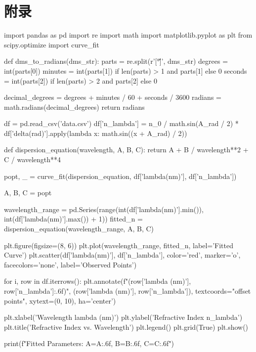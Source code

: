\documentclass[UTF8]{ctexart}
\begin{document}
\section{附录}
\begin{python}
    
    import pandas as pd
    import re
    import math
    import matplotlib.pyplot as plt
    from scipy.optimize import curve_fit

    def dms_to_radians(dms_str):
        parts = re.split(r'[°\'\"]', dms_str)
        degrees = int(parts[0])
        minutes = int(parts[1]) if len(parts) > 1 and parts[1] else 0
        seconds = int(parts[2]) if len(parts) > 2 and parts[2] else 0
    
        decimal_degrees = degrees + minutes / 60 + seconds / 3600
        radians = math.radians(decimal_degrees)
        return radians

    df = pd.read_csv('data.csv')
    df['n_lambda'] = n_0 / math.sin(A_rad / 2) * df['delta(rad)'].apply(lambda x: math.sin((x + A_rad) / 2))

    def dispersion_equation(wavelength, A, B, C):
        return A + B / wavelength**2 + C / wavelength**4

    popt, _ = curve_fit(dispersion_equation, df['lambda(nm)'], df['n_lambda'])

    A, B, C = popt

    wavelength_range = pd.Series(range(int(df['lambda(nm)'].min()), int(df['lambda(nm)'].max()) + 1))
    fitted_n = dispersion_equation(wavelength_range, A, B, C)

    plt.figure(figsize=(8, 6))
    plt.plot(wavelength_range, fitted_n, label='Fitted Curve')
    plt.scatter(df['lambda(nm)'], df['n_lambda'], color='red', marker='o', facecolors='none', label='Observed Points')

    for i, row in df.iterrows():
        plt.annotate(f"({row['lambda (nm)']}, {row['n_lambda']:.6f})", (row['lambda (nm)'], row['n_lambda']), textcoords="offset points", xytext=(0, 10), ha='center')

    plt.xlabel('Wavelength lambda (nm)') 
    plt.ylabel('Refractive Index n_lambda')
    plt.title('Refractive Index vs. Wavelength')
    plt.legend()
    plt.grid(True)
    plt.show()

    print(f"Fitted Parameters: A={A:.6f}, B={B:.6f}, C={C:.6f}")
    
\end{python}

\end{document}
